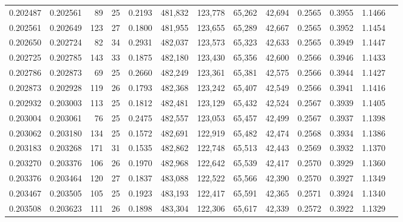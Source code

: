 \begin{tabular}{rrrrrrrrrrrrr}
0.202487 & 0.202561 &  89 &  25 &                                     0.2193 & 481,832 & 123,778 &  65,262 &  42,694 & 0.2565 & 0.3955 & 1.1466 \\
0.202561 & 0.202649 & 123 &  27 &                                     0.1800 & 481,955 & 123,655 &  65,289 &  42,667 & 0.2565 & 0.3952 & 1.1454 \\
0.202650 & 0.202724 &  82 &  34 &                                     0.2931 & 482,037 & 123,573 &  65,323 &  42,633 & 0.2565 & 0.3949 & 1.1447 \\
0.202725 & 0.202785 & 143 &  33 &                                     0.1875 & 482,180 & 123,430 &  65,356 &  42,600 & 0.2566 & 0.3946 & 1.1433 \\
0.202786 & 0.202873 &  69 &  25 &                                     0.2660 & 482,249 & 123,361 &  65,381 &  42,575 & 0.2566 & 0.3944 & 1.1427 \\
0.202873 & 0.202928 & 119 &  26 &                                     0.1793 & 482,368 & 123,242 &  65,407 &  42,549 & 0.2566 & 0.3941 & 1.1416 \\
0.202932 & 0.203003 & 113 &  25 &                                     0.1812 & 482,481 & 123,129 &  65,432 &  42,524 & 0.2567 & 0.3939 & 1.1405 \\
0.203004 & 0.203061 &  76 &  25 &                                     0.2475 & 482,557 & 123,053 &  65,457 &  42,499 & 0.2567 & 0.3937 & 1.1398 \\
0.203062 & 0.203180 & 134 &  25 &                                     0.1572 & 482,691 & 122,919 &  65,482 &  42,474 & 0.2568 & 0.3934 & 1.1386 \\
0.203183 & 0.203268 & 171 &  31 &                                     0.1535 & 482,862 & 122,748 &  65,513 &  42,443 & 0.2569 & 0.3932 & 1.1370 \\
0.203270 & 0.203376 & 106 &  26 &                                     0.1970 & 482,968 & 122,642 &  65,539 &  42,417 & 0.2570 & 0.3929 & 1.1360 \\
0.203376 & 0.203464 & 120 &  27 &                                     0.1837 & 483,088 & 122,522 &  65,566 &  42,390 & 0.2570 & 0.3927 & 1.1349 \\
0.203467 & 0.203505 & 105 &  25 &                                     0.1923 & 483,193 & 122,417 &  65,591 &  42,365 & 0.2571 & 0.3924 & 1.1340 \\
0.203508 & 0.203623 & 111 &  26 &                                     0.1898 & 483,304 & 122,306 &  65,617 &  42,339 & 0.2572 & 0.3922 & 1.1329 \\

\end{tabular}
